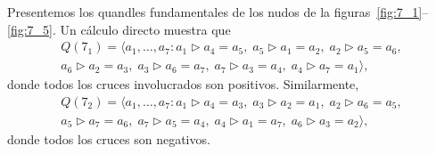 \documentclass[graybox]{svmult}
\begin{document}
	\label{block:Q(7_1):fundamental_quandle}
	\label{block:Q(7_2):fundamental_quandle}
	\label{block:Q(7_3):fundamental_quandle}
	\label{block:Q(7_4):fundamental_quandle}
	\label{block:Q(7_5):fundamental_quandle}
	\label{block:Q(7_6):fundamental_quandle}
	\label{block:Q(7_7):fundamental_quandle}
    Presentemos los quandles fundamentales de los nudos de la
    figuras~\ref{fig:7_1}--\ref{fig:7_5}. Un cálculo directo muestra que
	\begin{multline}
		Q(7_1)=\langle a_1,\dots,a_7:
		a_1\triangleright a_4=a_5,\;
		a_5\triangleright a_1=a_2,\;
		a_2\triangleright a_5=a_6,\\
		a_6\triangleright a_2=a_3,\;
		a_3\triangleright a_6=a_7,\;
		a_7\triangleright a_3=a_4,\;
		a_4\triangleright a_7=a_1\rangle,
	\end{multline}
    donde todos los cruces involucrados son positivos. 
	Similarmente, 
	\begin{multline}
		Q(7_2)=\langle a_1,\dots,a_7:
		a_1\triangleright a_4=a_3,\;
		a_3\triangleright a_2=a_1,\;
		a_2\triangleright a_6=a_5,\\
		a_5\triangleright a_7=a_6,\;
		a_7\triangleright a_5=a_4,\;
		a_4\triangleright a_1=a_7,\;
		a_6\triangleright a_3=a_2\rangle,
	\end{multline}
    donde todos los cruces son negativos. 
\end{document}
